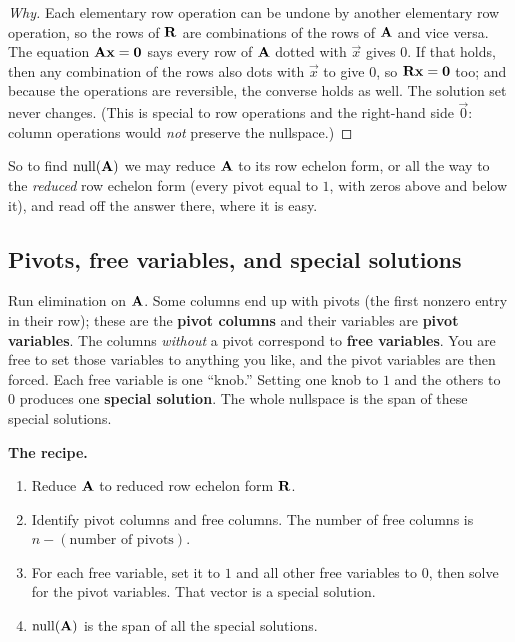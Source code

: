 \begin{proof}[Why]
Each elementary row operation can be undone by another elementary row operation,
so the rows of $\mathbf{R}$ are combinations of the rows of $\mathbf{A}$ and vice
versa. The equation $\mathbf{A}\mathbf{x}=\mathbf{0}$ says every row of $\mathbf{A}$ dotted
with $\vec{x}$ gives $0$. If that holds, then any combination of the rows also
dots with $\vec{x}$ to give $0$, so $\mathbf{R}\mathbf{x}=\mathbf{0}$ too; and because the
operations are reversible, the converse holds as well. The solution set never
changes. (This is special to row operations and the right-hand side $\vec
0$: column operations would \emph{not} preserve the nullspace.)
\end{proof}

So to find $\operatorname{null}(\mathbf{A})$ we may reduce
$\mathbf{A}$ to its row echelon form, or all the way to the \emph{reduced} row
echelon form (every pivot equal to $1$, with zeros above and below it), and read off the answer there, where it is easy.

\subsection{Pivots, free variables, and special solutions}

Run elimination on $\mathbf{A}$. Some columns end up with pivots (the first nonzero
entry in their row); these are the \textbf{pivot columns} and their variables are
\textbf{pivot variables}. The columns \emph{without} a pivot correspond to
\textbf{free variables}. You are free to set those
variables to anything you like, and the pivot variables are then forced. Each
free variable is one ``knob.'' Setting one knob to $1$ and the others to $0$ produces one
\textbf{special solution}. The whole nullspace is the span of these special
solutions.

\begin{focusbox}
\textbf{The recipe.}
\begin{enumerate}
  \item Reduce $\mathbf{A}$ to reduced row echelon form $\mathbf{R}$.
  \item Identify pivot columns and free columns. The number of free columns is
  $n - (\text{number of pivots})$.
  \item For each free variable, set it to $1$ and all other free variables to
  $0$, then solve for the pivot variables. That vector is a special solution.
  \item $\operatorname{null}(\mathbf{A})$ is the span of all the special solutions.
\end{enumerate}
\end{focusbox}

